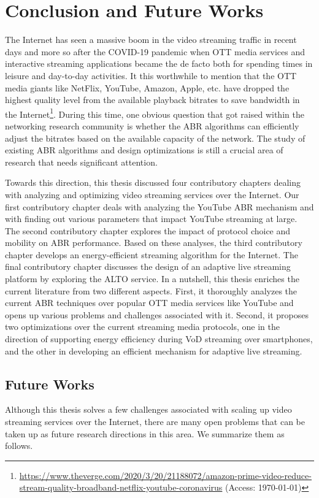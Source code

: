 \chapter{Conclusion and Future Works}
The Internet has seen a massive boom in the video streaming traffic in recent days and more so after the COVID-19 pandemic when OTT media services and interactive streaming applications became the de facto both for spending times in leisure and day-to-day activities. It this worthwhile to mention that the OTT media giants like NetFlix, YouTube, Amazon, Apple, etc. have dropped the highest quality level from the available playback bitrates to save bandwidth in the Internet\footnote{\url{https://www.theverge.com/2020/3/20/21188072/amazon-prime-video-reduce-stream-quality-broadband-netflix-youtube-coronavirus} (Access: \today)}. During this time, one obvious question that got raised within the networking research community is whether the ABR algorithms can efficiently adjust the bitrates based on the available capacity of the network. The study of existing ABR algorithms and design optimizations is still a crucial area of research that needs significant attention.  

Towards this direction, this thesis discussed four contributory chapters dealing with analyzing and optimizing video streaming services over the Internet. Our first contributory chapter deals with analyzing the YouTube ABR mechanism and with finding out various parameters that impact YouTube streaming at large. The second contributory chapter explores the impact of protocol choice and mobility on ABR performance. Based on these analyses, the third contributory chapter develops an energy-efficient streaming algorithm for the Internet. The final contributory chapter discusses the design of an adaptive live streaming platform by exploring the ALTO service. In a nutshell, this thesis enriches the current literature from two different aspects. First, it thoroughly analyzes the current ABR techniques over popular OTT media services like YouTube and opens up various problems and challenges associated with it. Second, it proposes two optimizations over the current streaming media protocols, one in the direction of supporting energy efficiency during VoD streaming over smartphones, and the other in developing an efficient mechanism for adaptive live streaming.

\section{Future Works}
Although this thesis solves a few challenges associated with scaling up video streaming services over the Internet, there are many open problems that can be taken up as future research directions in this area. We summarize them as follows. 

